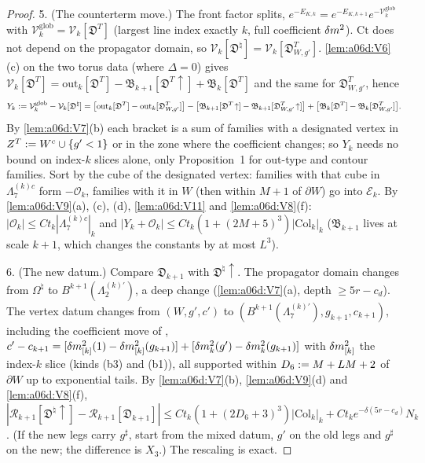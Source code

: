 \begin{proof}
5. (The counterterm move.) The front factor splits, $e^{-E_{K,k}}=e^{-E_{K,k+1}}e^{-\mathcal V^{\mathrm{glob}}_k}$ with $\mathcal V^{\mathrm{glob}}_k=\mathcal V_k[\mathfrak D^T]$ (largest line index exactly $k$, full coefficient $\delta m^2$). $\mathrm{Ct}$ does not depend on the propagator domain, so $\mathcal V_k[\mathfrak D^\natural]=\mathcal V_k[\mathfrak D^T_{W,g'}]$. \cref{lem:a06d:V6}(c) on the two torus data (where $\Delta=0$) gives $\mathcal V_k[\mathfrak D^T]=\mathrm{out}_k[\mathfrak D^T]-\mathfrak B_{k+1}[\mathfrak D^T\!\uparrow]+\mathfrak B_k[\mathfrak D^T]$ and the same for $\mathfrak D^T_{W,g'}$, hence
\[
Y_k:=\mathcal V^{\mathrm{glob}}_k-\mathcal V_k[\mathfrak D^\natural]=\big[\mathrm{out}_k[\mathfrak D^T]-\mathrm{out}_k[\mathfrak D^T_{W,g'}]\big]-\big[\mathfrak B_{k+1}[\mathfrak D^T\!\uparrow]-\mathfrak B_{k+1}[\mathfrak D^T_{W,g'}\!\uparrow]\big]+\big[\mathfrak B_k[\mathfrak D^T]-\mathfrak B_k[\mathfrak D^T_{W,g'}]\big].
\]
By \cref{lem:a06d:V7}(b) each bracket is a sum of families with a designated vertex in $Z^T:= W^c\cup\{g'<1\}$ or in the zone where the coefficient changes; so $Y_k$ needs no bound on index-$k$ slices alone, only Proposition~1 for out-type and contour families. Sort by the cube of the designated vertex: families with that cube in $\Lambda^{(k)c}_7$ form $-\mathcal O_k$, families with it in $W$ (then within $M+1$ of $\partial W$) go into $\mathcal E_k$. By \cref{lem:a06d:V9}(a), (c), (d), \cref{lem:a06d:V11} and \cref{lem:a06d:V8}(f): $|\mathcal O_k|\le Ct_k|\Lambda^{(k)c}_7|_k$ and $|Y_k+\mathcal O_k|\le Ct_k(1+(2M+5)^3)|\mathrm{Col}_k|_k$ ($\mathfrak B_{k+1}$ lives at scale $k+1$, which changes the constants by at most $L^3$).

6. (The new datum.) Compare $\mathfrak D_{k+1}$ with $\mathfrak D^\natural\!\uparrow$. The propagator domain changes from $\Omega^\natural$ to $B^{k+1}(\Lambda^{(k)'}_2)$, a deep change (\cref{lem:a06d:V7}(a), depth $\ge5r-c_d$). The vertex datum changes from $(W,g',c')$ to $(B^{k+1}(\Lambda^{(k)'}_7),g_{k+1},c_{k+1})$, including the coefficient move of \cite[(1.28)--(1.29)]{Ba3}, $c'-c_{k+1}=[\delta m^2_{[k]}(1)-\delta m^2_{[k]}(g_{k+1})]+[\delta m^2_k(g')-\delta m^2_k(g_{k+1})]$ with $\delta m^2_{[k]}$ the index-$k$ slice (kinds (b3) and (b1)), all supported within $D_6:= M+LM+2$ of $\partial W$ up to exponential tails. By \cref{lem:a06d:V7}(b), \cref{lem:a06d:V9}(d) and \cref{lem:a06d:V8}(f), $|\mathcal R_{k+1}[\mathfrak D^\natural\!\uparrow]-\mathcal R_{k+1}[\mathfrak D_{k+1}]|\le Ct_k(1+(2D_6+3)^3)|\mathrm{Col}_k|_k+Ct_ke^{-\delta(5r-c_d)}N_k$. (If the new legs carry $g^\sharp$, start from the mixed datum, $g'$ on the old legs and $g^\sharp$ on the new; the difference is $X_3$.) The rescaling is exact.


\end{proof}
